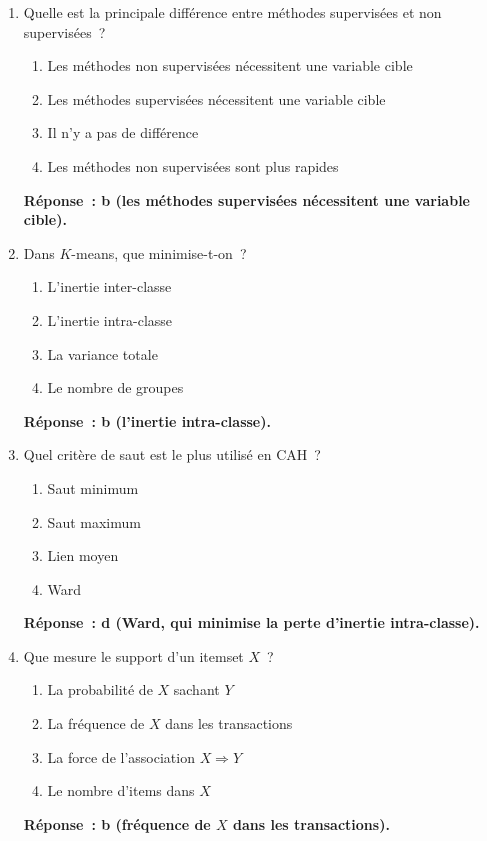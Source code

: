 \documentclass[a4paper,11pt]{article}
\theoremstyle{definition}
\theoremstyle{remark}
\begin{document}
\begin{enumerate}

  \item Quelle est la principale diff\'erence entre m\'ethodes
    supervis\'ees et non supervis\'ees~?
    \begin{enumerate}
      \item Les m\'ethodes non supervis\'ees n\'ecessitent une
        variable cible
      \item Les m\'ethodes supervis\'ees n\'ecessitent une
        variable cible
      \item Il n'y a pas de diff\'erence
      \item Les m\'ethodes non supervis\'ees sont plus rapides
    \end{enumerate}
    \textbf{R\'eponse~: b (les m\'ethodes supervis\'ees
    n\'ecessitent une variable cible).}

  \item Dans $K$-means, que minimise-t-on~?
    \begin{enumerate}
      \item L'inertie inter-classe
      \item L'inertie intra-classe
      \item La variance totale
      \item Le nombre de groupes
    \end{enumerate}
    \textbf{R\'eponse~: b (l'inertie intra-classe).}

  \item Quel crit\`ere de saut est le plus utilis\'e en CAH~?
    \begin{enumerate}
      \item Saut minimum
      \item Saut maximum
      \item Lien moyen
      \item Ward
    \end{enumerate}
    \textbf{R\'eponse~: d (Ward, qui minimise la perte d'inertie
    intra-classe).}

  \item Que mesure le support d'un itemset $X$~?
    \begin{enumerate}
      \item La probabilit\'e de $X$ sachant $Y$
      \item La fr\'equence de $X$ dans les transactions
      \item La force de l'association $X \Rightarrow Y$
      \item Le nombre d'items dans $X$
    \end{enumerate}
    \textbf{R\'eponse~: b (fr\'equence de $X$ dans les
    transactions).}


\end{enumerate}
\end{document}
